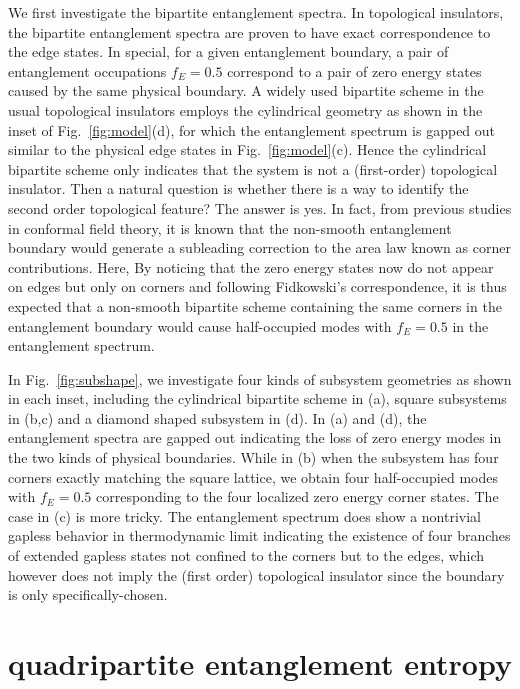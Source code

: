 \documentclass[twocolumn,superscriptaddress]{revtex4-1}
\begin{document}
We first investigate the bipartite entanglement spectra. In topological insulators, the bipartite entanglement spectra are proven to have exact correspondence to the edge states. \cite{Fidkowski_PRL_2010} In special, for a given entanglement boundary, a pair of entanglement occupations $f_{E}=0.5$ correspond to a pair of zero energy states caused by the same physical boundary. A widely used bipartite scheme in the usual topological insulators employs the cylindrical geometry as shown in the inset of Fig.~\ref{fig:model}(d), for which the entanglement spectrum is gapped out similar to the physical edge states in Fig.~\ref{fig:model}(c). Hence the cylindrical bipartite scheme only indicates that the system is not a (first-order) topological insulator. Then a natural question is whether there is a way to identify the second order topological feature? The answer is yes. In fact, from previous studies in conformal field theory, it is known that the non-smooth entanglement boundary would generate a subleading correction to the area law known as corner contributions. \cite{Laflorencie_PR_2016} Here, By noticing that the zero energy states now do not appear on edges but only on corners and following Fidkowski's correspondence, it is thus expected that a non-smooth bipartite scheme containing the same corners in the entanglement boundary would cause half-occupied modes with $f_E=0.5$ in the entanglement spectrum.

In Fig.~\ref{fig:subshape}, we investigate four kinds of subsystem geometries as shown in each inset, including the cylindrical bipartite scheme in (a), square subsystems in (b,c) and a diamond shaped subsystem in (d). In (a) and (d), the entanglement spectra are gapped out indicating the loss of zero energy modes in the two kinds of physical boundaries. While in (b) when the subsystem has four corners exactly matching the square lattice, we obtain four half-occupied modes with $f_{E}=0.5$ corresponding to the four localized zero energy corner states. The case in (c) is more tricky. The entanglement spectrum does show a nontrivial gapless behavior in thermodynamic limit indicating the existence of four branches of extended gapless states not confined to the corners but to the edges, which however does not imply the (first order) topological insulator since the boundary is only specifically-chosen. 

\section{quadripartite entanglement entropy}
\end{document}
